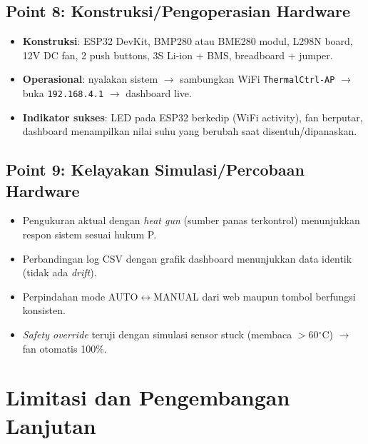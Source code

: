 \documentclass[11pt,a4paper]{article}
\begin{document}
\subsection{Point 8: Konstruksi/Pengoperasian Hardware}

\begin{itemize}
    \item \textbf{Konstruksi}: ESP32 DevKit, BMP280 atau BME280 modul, L298N board, 12V DC fan, 2 push buttons, 3S Li-ion + BMS, breadboard + jumper.
    \item \textbf{Operasional}: nyalakan sistem $\rightarrow$ sambungkan WiFi \texttt{ThermalCtrl-AP} $\rightarrow$ buka \texttt{192.168.4.1} $\rightarrow$ dashboard live.
    \item \textbf{Indikator sukses}: LED pada ESP32 berkedip (WiFi activity), fan berputar, dashboard menampilkan nilai suhu yang berubah saat disentuh/dipanaskan.
\end{itemize}

\subsection{Point 9: Kelayakan Simulasi/Percobaan Hardware}

\begin{itemize}
    \item Pengukuran aktual dengan \emph{heat gun} (sumber panas terkontrol) menunjukkan respon sistem sesuai hukum P.
    \item Perbandingan log CSV dengan grafik dashboard menunjukkan data identik (tidak ada \emph{drift}).
    \item Perpindahan mode AUTO$\leftrightarrow$MANUAL dari web maupun tombol berfungsi konsisten.
    \item \emph{Safety override} teruji dengan simulasi sensor stuck (membaca $>$60$^{\circ}$C) $\rightarrow$ fan otomatis 100\%.
\end{itemize}

\section{Limitasi dan Pengembangan Lanjutan}
\end{document}
